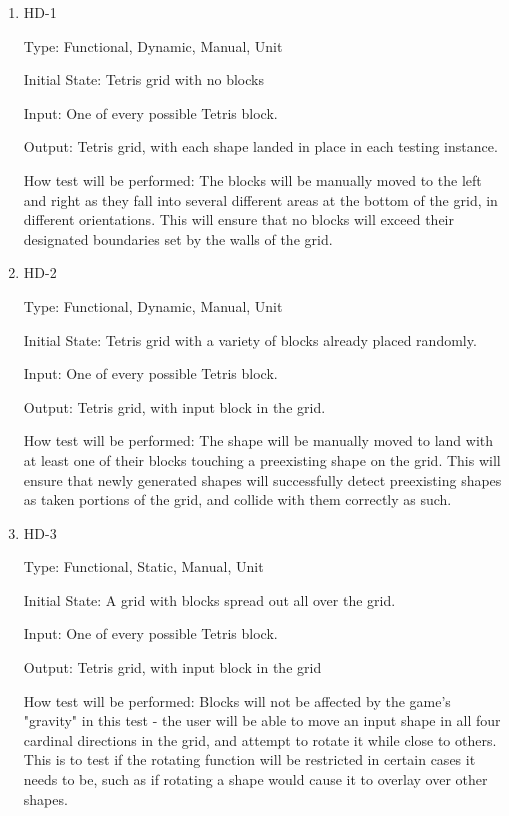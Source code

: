 \documentclass[12pt, titlepage]{article}
\begin{document}
\begin{enumerate}

\item{HD-1\\}

Type: Functional, Dynamic, Manual, Unit
					
Initial State: Tetris grid with no blocks
					
Input: One of every possible Tetris block.
					
Output: Tetris grid, with each shape landed in place in each testing instance.
					
How test will be performed: The blocks will be manually moved to the left and right as they fall into several different areas at the bottom of the grid, in different orientations. This will ensure that no blocks will exceed their designated boundaries set by the walls of the grid.


\item{HD-2\\}

Type: Functional, Dynamic, Manual, Unit
					
Initial State: Tetris grid with a variety of blocks already placed randomly.
					
Input: One of every possible Tetris block.
					
Output: Tetris grid, with input block in the grid.
					
How test will be performed: The shape will be manually moved to land with at least one of their blocks touching a preexisting shape on the grid. This will ensure that newly generated shapes will successfully detect preexisting shapes as taken portions of the grid, and collide with them correctly as such.

\item{HD-3\\}

Type: Functional, Static, Manual, Unit
					
Initial State: A grid with blocks spread out all over the grid.
					
Input: One of every possible Tetris block.
					
Output: Tetris grid, with input block in the grid
					
How test will be performed: Blocks will not be affected by the game's "gravity" in this test - the user will be able to move an input shape in all four cardinal directions in the grid, and attempt to rotate it while close to others. This is to test if the rotating function will be restricted in certain cases it needs to be, such as if rotating a shape would cause it to overlay over other shapes.


\end{enumerate}
\end{document}
